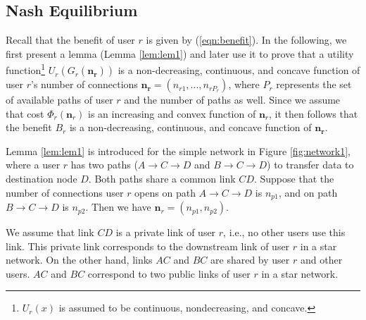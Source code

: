 \documentclass[conference]{IEEEtran}
\begin{document}

\subsection{Nash Equilibrium}


Recall that the benefit of user $r$ is given by
(\ref{eqn:benefit}).
In the following, we first present a lemma (Lemma \ref{lem:lem1})
and later use it to prove that a utility
function\footnote{$U_r(x)$ is assumed to be continuous,
nondecreasing, and concave.} $U_r(G_r(\mathbf{n_r}))$ is a
non-decreasing, continuous, and concave function of user $r$'s
number of connections $\mathbf{n_r}=(n_{r1}, ..., n_{rP_r})$,
where $P_r$ represents the set of available paths of user $r$ and
the number of paths as well. Since we assume that cost
$\Phi_r(\mathbf{n}_r)$ is an increasing and convex function of
$\mathbf{n}_r$, it then follows that the benefit $B_r$ is a
non-decreasing, continuous, and concave function of
$\mathbf{n_r}$.

Lemma \ref{lem:lem1} is introduced for the simple network in
Figure \ref{fig:network1}, where a user $r$ has two paths ($A\to C
\to D$ and $B\to C \to D$) to transfer data to destination node
$D$. Both paths share a common link $CD$.
Suppose that the number of connections user $r$ opens on path
$A\to C \to D$ is $n_{p1}$, and on path $B\to C \to D$ is
$n_{p2}$. Then we have $\mathbf{n}_r=(n_{p1}, n_{p2})$.

We assume that link $CD$ is a private link of user $r$, i.e., no
other users use this link. This private link corresponds to the
downstream link of user $r$ in a star network. On the other hand,
links $AC$ and $BC$ are shared by user $r$ and other users. $AC$
and $BC$ correspond to two public links of user $r$ in a star
network.

\begin{comment}
\begin{figure}[htb!]
    \begin{center}
\texttt{[image: ./eps\_BT\_research/network1.eps]}
\caption{A three-node topology.
} \label{fig:network1}
     \end{center}
\end{figure}
\end{comment}
\end{document}
